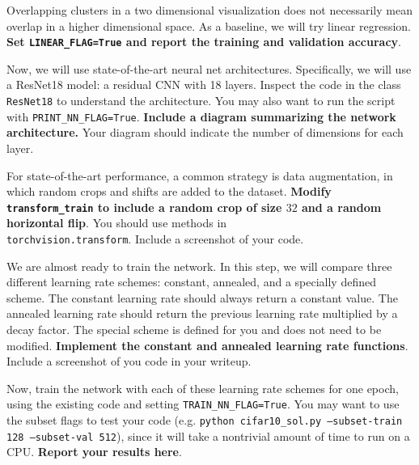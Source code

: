 \documentclass[11pt]{article}
\begin{document}
\begin{Parts}
\Part 
Overlapping clusters in a two dimensional visualization does not necessarily mean overlap in a higher dimensional space. 
As a baseline, we will try linear regression. {\bf Set \texttt{LINEAR\_FLAG=True} and report the training and validation accuracy}.

\begin{tcolorbox}[breakable]
\end{tcolorbox}

\Part Now, we will use state-of-the-art neural net architectures. Specifically, we will use a ResNet18 model: a residual CNN with 18 layers. Inspect the code in the class \texttt{ResNet18} to understand the architecture. You may also want to run the script with \texttt{PRINT\_NN\_FLAG=True}. {\bf Include a diagram summarizing the network architecture.} Your diagram should indicate the number of dimensions for each layer. 

\begin{tcolorbox}[breakable]
\end{tcolorbox}

\Part For state-of-the-art performance, a common strategy is data augmentation, in which random crops and shifts are added to the dataset. 
{\bf Modify \texttt{transform\_train} to include a random crop of size $32$ and a random horizontal flip}. You should use methods in \\
\texttt{torchvision.transform}. Include a screenshot of your code.

\begin{tcolorbox}[breakable]
\end{tcolorbox}

\Part We are almost ready to train the network.
In this step, we will compare three different learning rate schemes: constant, annealed, and a specially defined scheme.
The constant learning rate should always return a constant value. The annealed learning rate should return the previous learning rate multiplied by a decay factor.
The special scheme is defined for you and does not need to be modified. 
{\bf Implement the constant and annealed learning rate functions}. 
Include a screenshot of you code in your writeup.

Now, train the network with each of these learning rate schemes for one epoch, using the existing code and setting \texttt{TRAIN\_NN\_FLAG=True}.
You may want to use the subset flags to test your code (e.g. \texttt{python cifar10\_sol.py --subset-train 128 --subset-val 512}), since it will take a nontrivial amount of time to run on a CPU.
{\bf Report your results here}. 


\end{Parts}
\end{document}

